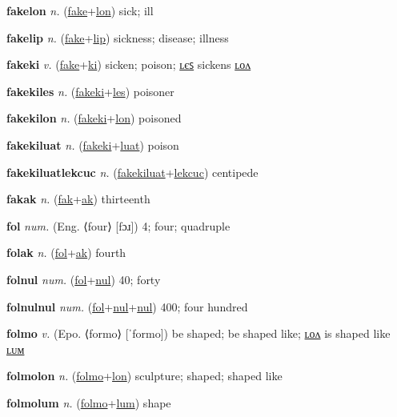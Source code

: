 \textbf{\hypertarget{fakelon}{fakelon}} \textit{n.} (\hyperlink{fake}{fake}+\allowbreak \hyperlink{lon}{lon})
sick; ill

\textbf{\hypertarget{fakelip}{fakelip}} \textit{n.} (\hyperlink{fake}{fake}+\allowbreak \hyperlink{lip}{lip})
sickness; disease; illness

\textbf{\hypertarget{fakeki}{fakeki}} \textit{v.} (\hyperlink{fake}{fake}+\allowbreak \hyperlink{ki}{ki})
sicken; poison; \hyperlink{fakekiles}{ʟєꜱ} sickens \hyperlink{fakekilon}{ʟᴏᴧ}

\textbf{\hypertarget{fakekiles}{fakekiles}} \textit{n.} (\hyperlink{fakeki}{fakeki}+\allowbreak \hyperlink{les}{les})
poisoner

\textbf{\hypertarget{fakekilon}{fakekilon}} \textit{n.} (\hyperlink{fakeki}{fakeki}+\allowbreak \hyperlink{lon}{lon})
poisoned

\textbf{\hypertarget{fakekiluat}{fakekiluat}} \textit{n.} (\hyperlink{fakeki}{fakeki}+\allowbreak \hyperlink{luat}{luat})
poison

\textbf{\hypertarget{fakekiluatlekcuc}{fakekiluatlekcuc}} \textit{n.} (\hyperlink{fakekiluat}{fakekiluat}+\allowbreak \hyperlink{lekcuc}{lekcuc})
centipede

\textbf{\hypertarget{fakak}{fakak}} \textit{n.} (\hyperlink{fak}{fak}+\allowbreak \hyperlink{ak}{ak})
thirteenth

\textbf{\hypertarget{fol}{fol}} \textit{num.} (Eng. ⟨four⟩ [fɔɹ])
4; four; quadruple

\textbf{\hypertarget{folak}{folak}} \textit{n.} (\hyperlink{fol}{fol}+\allowbreak \hyperlink{ak}{ak})
fourth

\textbf{\hypertarget{folnul}{folnul}} \textit{num.} (\hyperlink{fol}{fol}+\allowbreak \hyperlink{nul}{nul})
40; forty

\textbf{\hypertarget{folnulnul}{folnulnul}} \textit{num.} (\hyperlink{fol}{fol}+\allowbreak \hyperlink{nul}{nul}+\allowbreak \hyperlink{nul}{nul})
400; four hundred

\textbf{\hypertarget{folmo}{folmo}} \textit{v.} (Epo. ⟨formo⟩ [ˈformo])
be shaped; be shaped like; \hyperlink{folmolon}{ʟᴏᴧ} is shaped like \hyperlink{folmolum}{ʟᴜᴍ}

\textbf{\hypertarget{folmolon}{folmolon}} \textit{n.} (\hyperlink{folmo}{folmo}+\allowbreak \hyperlink{lon}{lon})
sculpture; shaped; shaped like

\textbf{\hypertarget{folmolum}{folmolum}} \textit{n.} (\hyperlink{folmo}{folmo}+\allowbreak \hyperlink{lum}{lum})
shape

